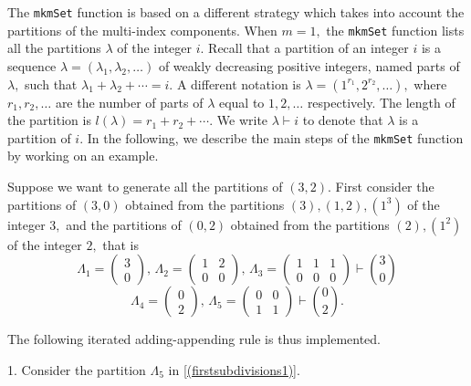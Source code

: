 The \texttt{mkmSet} function is based on a different strategy which takes into account the partitions of the multi-index components. When \(m=1,\) the \texttt{mkmSet} function lists all the partitions \(\lambda\) of the integer \(i.\) Recall that a partition of an integer \(i\) is a sequence \(\lambda = (\lambda_1, \lambda_2, \ldots)\) of weakly decreasing positive integers, named parts of \(\lambda,\) such that \(\lambda_1 + \lambda_2 + \cdots = i.\) A different notation is \(\lambda = (1^{r_1}, 2^{r_2}, \ldots),\) where \(r_1, r_2, \ldots\) are the number of parts of \(\lambda\) equal to \(1,2,\ldots\) respectively. The length of the partition is \(l(\lambda)=r_1 + r_2 + \cdots.\) We write \(\lambda \vdash i\) to denote that \(\lambda\) is a partition of \(i.\)
In the following, we describe the main steps of the \texttt{mkmSet} function by working on an example.

Suppose we want to generate all the partitions of \((3,2).\) First consider the partitions of \((3,0)\) obtained from the partitions \((3), (1,2), (1^3)\) of the integer \(3,\) and the partitions of \((0,2)\) obtained from the partitions \((2),(1^2)\) of the integer \(2,\) that is
\begin{equation}
\Lambda_1= \begin{pmatrix}
3 \\
0
\end{pmatrix}\!\!, \, \Lambda_2= \begin{pmatrix}
1 & 2 \\
0 & 0
\end{pmatrix}\!\!, \, \Lambda_3=\begin{pmatrix}
1 & 1 & 1 \\
0 & 0 & 0
\end{pmatrix} \vdash {3 \choose 0}
\label{(firstsubdivisions)}
\end{equation}
\begin{equation}
\Lambda_4= \begin{pmatrix}
0 \\
2
\end{pmatrix}\!\!, \, \Lambda_5= \begin{pmatrix}
0 & 0 \\
1 & 1
\end{pmatrix} \vdash {0 \choose 2}.
\label{(firstsubdivisions1)}
\end{equation}

\noindent The following iterated adding-appending rule is thus implemented.

\hskip-0.5cm 1. Consider the partition \(\Lambda_5\) in \eqref{(firstsubdivisions1)}.

